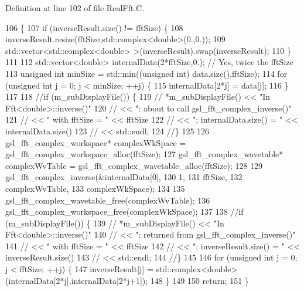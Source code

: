 Definition at line 102 of file Real\-Fft.\-C.


\begin{DoxyCode}
106 \{
107   \textcolor{keywordflow}{if} (inverseResult.size() != fftSize) \{
108     inverseResult.resize(fftSize,std::complex<double>(0.,0.));
109     std::vector<std::complex<double> >(inverseResult).swap(inverseResult);
110   \}
111 
112   std::vector<double> internalData(2*fftSize,0.); \textcolor{comment}{// Yes, twice the fftSize}
113   \textcolor{keywordtype}{unsigned} \textcolor{keywordtype}{int} minSize = std::min((\textcolor{keywordtype}{unsigned} \textcolor{keywordtype}{int}) data.size(),fftSize);
114   \textcolor{keywordflow}{for} (\textcolor{keywordtype}{unsigned} \textcolor{keywordtype}{int} j = 0; j < minSize; ++j) \{
115     internalData[2*j] = data[j];
116   \}
117 
118   \textcolor{comment}{//if (m\_subDisplayFile()) \{}
119   \textcolor{comment}{//  *m\_subDisplayFile() << "In Fft<double>::inverse()"}
120   \textcolor{comment}{//                     << ": about to call gsl\_fft\_complex\_inverse()"}
121   \textcolor{comment}{//                     << " with fftSize = "         << fftSize}
122   \textcolor{comment}{//                     << "; internalData.size() = " << internalData.size()}
123   \textcolor{comment}{//                     << std::endl;}
124   \textcolor{comment}{//\}}
125 
126   gsl\_fft\_complex\_workspace* complexWkSpace = gsl\_fft\_complex\_workspace\_alloc(fftSize);
127   gsl\_fft\_complex\_wavetable* complexWvTable = gsl\_fft\_complex\_wavetable\_alloc(fftSize);
128 
129   gsl\_fft\_complex\_inverse(&internalData[0],
130                           1,
131                           fftSize,
132                           complexWvTable,
133                           complexWkSpace);
134 
135   gsl\_fft\_complex\_wavetable\_free(complexWvTable);
136   gsl\_fft\_complex\_workspace\_free(complexWkSpace);
137 
138   \textcolor{comment}{//if (m\_subDisplayFile()) \{}
139   \textcolor{comment}{//  *m\_subDisplayFile() << "In Fft<double>::inverse()"}
140   \textcolor{comment}{//                     << ": returned from gsl\_fft\_complex\_inverse()"}
141   \textcolor{comment}{//                     << " with fftSize = "          << fftSize}
142   \textcolor{comment}{//                     << "; inverseResult.size() = " << inverseResult.size()}
143   \textcolor{comment}{//                     << std::endl;}
144   \textcolor{comment}{//\}}
145 
146   \textcolor{keywordflow}{for} (\textcolor{keywordtype}{unsigned} \textcolor{keywordtype}{int} j = 0; j < fftSize; ++j) \{
147     inverseResult[j] = std::complex<double>(internalData[2*j],internalData[2*j+1]);
148   \}
149 
150   \textcolor{keywordflow}{return};
151 \}
\end{DoxyCode}
